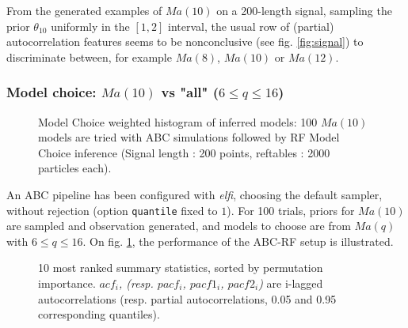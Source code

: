 \documentclass[long, final]{jobim}
\begin{document}
From the generated examples of $Ma(10)$ on a 200-length signal, sampling the prior $\theta_{10}$ uniformly in the $[1,2]$ interval, the usual row of (partial) autocorrelation features seems to be nonconclusive (see fig. \ref{fig:signal}) to discriminate between, for example $Ma(8)$, $Ma(10)$ or $Ma(12)$.

\subsubsection{Model choice: $Ma(10)$ vs "all" ($6 \leq q \leq 16$)}
\label{sec:modelchoice-all}

\begin{figure}
  \begin{center}
    \setlength{\unitlength}{5mm}
    
  \end{center}
  \caption{Model Choice weighted histogram of inferred models: 100 $Ma(10)$ models are tried with ABC simulations followed by RF Model Choice inference (Signal length : 200 points, reftables : 2000 particles each).}
  \label{fig:modelchoice-loop}
\end{figure}

An ABC pipeline has been configured with \emph{elfi}, choosing the default sampler, without rejection  (option \verb+quantile+ fixed to $1$). For 100 trials, priors for $Ma(10)$ are sampled and observation generated, and models to choose are from $Ma(q)$ with $6 \leq q \leq 16$. On fig. \ref{fig:modelchoice-loop}, the performance of the ABC-RF setup is illustrated. 

\begin{figure}
  \begin{center}
    \setlength{\unitlength}{5mm}
    
  \end{center}
  \caption{10 most ranked summary statistics, sorted by permutation importance. \emph{$acf_i$, (resp. $pacf_i$, $pacf1_i$, $pacf2_i$)} are i-lagged autocorrelations (resp. partial autocorrelations, 0.05 and 0.95 corresponding quantiles).}
  \label{fig:rank}
\end{figure}
\end{document}

